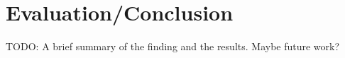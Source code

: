 \section{Evaluation/Conclusion}
TODO: A brief summary of the finding and the results. Maybe future work?